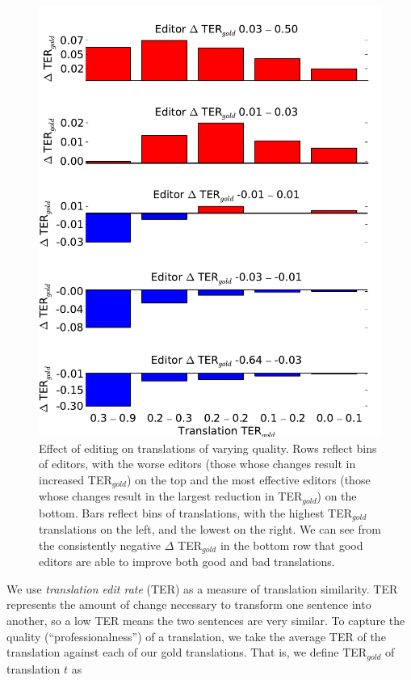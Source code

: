 \documentclass[11pt]{article}
\begin{document}
\begin{figure}[h]
  \centering
  \includegraphics[width=\linewidth]{editor-bins}
  \caption{Effect of editing on translations of varying quality. Rows reflect bins of editors, with the worse editors (those whose changes result in increased TER$_{gold}$) on the top and the most effective editors (those whose changes result in the largest reduction in TER$_{gold}$) on the bottom. Bars reflect bins of translations, with the highest TER$_{gold}$ translations on the left, and the lowest on the right. We can see from the consistently negative $\Delta$ TER$_{gold}$ in the bottom row that good editors are able to improve both good and bad translations.}
    \label{editor-bins}
\end{figure}


We use \textit{translation edit rate} (TER) as a measure of translation similarity. TER represents the amount of change necessary to transform one sentence into another, so a low TER means the two sentences are very similar. To capture the quality (``professionalness'') of a translation, we take the average TER of the translation against each of our gold translations. That is, we define TER$_{gold}$ of translation $t$ as
\end{document}
